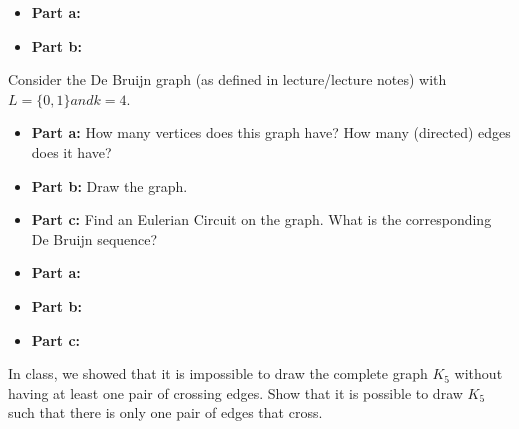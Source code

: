 \documentclass{article}
\begin{document}
\begin{solution}
\begin{itemize}
	\item[]{\textbf{Part a:}}
	\item[]{\textbf{Part b:}}
\end{itemize}
\end{solution}


\begin{problem} Consider the De Bruijn graph (as defined in lecture/lecture notes) with $L = \{0,1\} and k=4$.
\begin{itemize}
	\item[]{\textbf{Part a:}} How many vertices does this graph have? How many (directed) edges does it have?
	\item[]{\textbf{Part b:}} Draw the graph.
	\item[]{\textbf{Part c:}} Find an Eulerian Circuit on the graph. What is the corresponding De Bruijn sequence?
\end{itemize}
\end{problem}

\begin{solution}
\begin{itemize}
	\item[]{\textbf{Part a:}}
	\item[]{\textbf{Part b:}}
	\item[]{\textbf{Part c:}}
\end{itemize}
\end{solution}


\begin{problem} In class, we showed that it is impossible to draw the complete graph $K_5$ without having at least one pair of crossing edges. Show that it is possible to draw $K_5$ such that there is only one pair of edges that cross.
\end{problem}

\begin{solution}
\end{solution}
\end{document}
